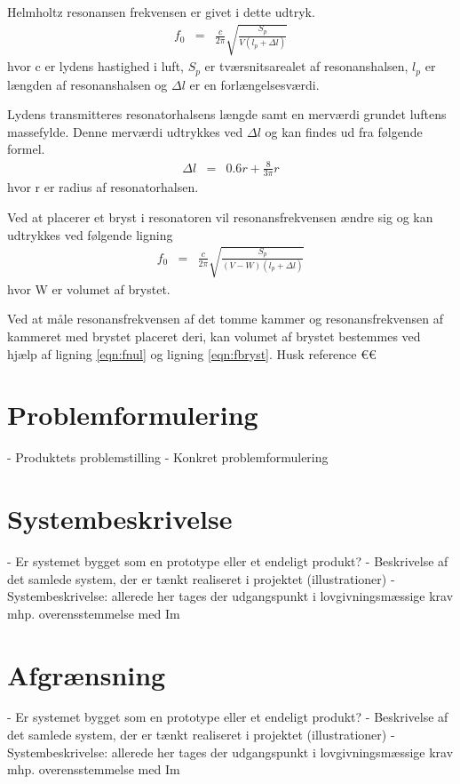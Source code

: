 Helmholtz resonansen frekvensen er givet i dette udtryk. 
\begin{eqnarray}
\label{eqn:fnul}
f_{0}&=&\frac{c}{2\pi}\sqrt{\frac{S_{p}}{V \left(l_{p}+\Delta l\right)}}
\end{eqnarray}
hvor c er lydens hastighed i luft, $S_{p}$ er tværsnitsarealet af resonanshalsen, $l_{p}$ er længden af resonanshalsen og $\Delta l$ er en forlængelsesværdi. 

Lydens transmitteres resonatorhalsens længde samt en merværdi grundet luftens massefylde. Denne merværdi udtrykkes ved $\Delta l$ og kan findes ud fra følgende formel. 
\begin{eqnarray}
\Delta l&=&0.6r+\frac{8}{3\pi}r
\end{eqnarray}
hvor r er radius af resonatorhalsen.

Ved at placerer et bryst i resonatoren vil resonansfrekvensen ændre sig og kan udtrykkes ved følgende ligning
\begin{eqnarray}
\label{eqn:fbryst}
f_{0}&=&\frac{c}{2\pi}\sqrt{\frac{S_{p}}{(V-W)\left(l_{p}+\Delta l\right)}}
\end{eqnarray}
hvor W er volumet af brystet. 

Ved at måle resonansfrekvensen af det tomme kammer og resonansfrekvensen af kammeret med brystet placeret deri, kan volumet af brystet bestemmes ved hjælp af ligning \ref{eqn:fnul} og ligning \ref{eqn:fbryst}. Husk reference €€

\section{Problemformulering}
- Produktets problemstilling
- Konkret problemformulering

\section{Systembeskrivelse}
- Er systemet bygget som en prototype eller et endeligt produkt? 
- Beskrivelse af det samlede system, der er tænkt realiseret i projektet (illustrationer)
- Systembeskrivelse: allerede her tages der udgangspunkt i lovgivningsmæssige krav mhp. overensstemmelse med Im

\section{Afgrænsning}
- Er systemet bygget som en prototype eller et endeligt produkt? 
- Beskrivelse af det samlede system, der er tænkt realiseret i projektet (illustrationer)
- Systembeskrivelse: allerede her tages der udgangspunkt i lovgivningsmæssige krav mhp. overensstemmelse med Im

